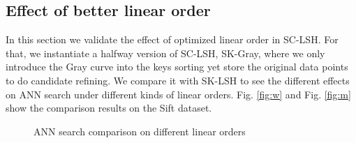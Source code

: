 \documentclass[twocolumn]{svjour3}          %
\begin{document}
\subsection{Effect of better linear order}
In this section we validate the effect of optimized linear order in SC-LSH. For that, we instantiate a halfway version of SC-LSH, SK-Gray, where we only introduce the Gray curve into the keys sorting yet store the original data points to do candidate refining. We compare it with SK-LSH to see the different effects on ANN search under different kinds of linear orders. Fig. \ref{fig:w} and Fig. \ref{fig:m} show the comparison results on the Sift dataset.
\begin{figure}[t]
	\begin{center}
	\end{center}
	\caption{ANN search comparison on different linear orders}
	\label{fig:ordercomp}
\end{figure}
\end{document}
